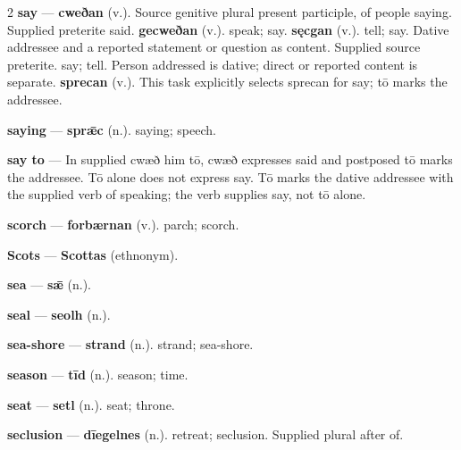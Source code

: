 \begin{multicols}{2}
\textbf{say} — \textbf{cweðan} (v.). Source genitive plural present participle, of people saying. Supplied preterite said. \textbf{gecweðan} (v.). speak; say. \textbf{sęcgan} (v.). tell; say. Dative addressee and a reported statement or question as content. Supplied source preterite. say; tell. Person addressed is dative; direct or reported content is separate. \textbf{sprecan} (v.). This task explicitly selects sprecan for say; tō marks the addressee.\par
\textbf{saying} — \textbf{sprǣc} (n.). saying; speech.\par
\textbf{say to} — In supplied cwæð him tō, cwæð expresses said and postposed tō marks the addressee. Tō alone does not express say. Tō marks the dative addressee with the supplied verb of speaking; the verb supplies say, not tō alone.\par
\textbf{scorch} — \textbf{forbærnan} (v.). parch; scorch.\par
\textbf{Scots} — \textbf{Scottas} (ethnonym).\par
\textbf{sea} — \textbf{sǣ} (n.).\par
\textbf{seal} — \textbf{seolh} (n.).\par
\textbf{sea-shore} — \textbf{strand} (n.). strand; sea-shore.\par
\textbf{season} — \textbf{tīd} (n.). season; time.\par
\textbf{seat} — \textbf{setl} (n.). seat; throne.\par
\textbf{seclusion} — \textbf{dīegelnes} (n.). retreat; seclusion. Supplied plural after of.\par

\end{multicols}
